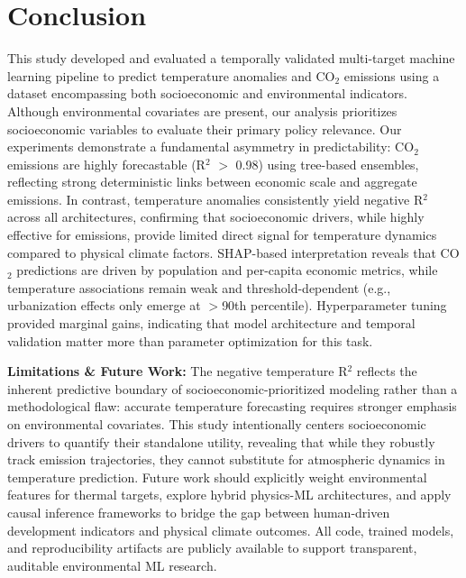 \documentclass[12pt, a4paper]{article}
\begin{document}
\section{Conclusion}
This study developed and evaluated a temporally validated multi-target machine learning pipeline to predict temperature anomalies and CO$_2$ emissions using a dataset encompassing both socioeconomic and environmental indicators. Although environmental covariates are present, our analysis prioritizes socioeconomic variables to evaluate their primary policy relevance. Our experiments demonstrate a fundamental asymmetry in predictability: CO$_2$ emissions are highly forecastable (R$^2$ $>$ 0.98) using tree-based ensembles, reflecting strong deterministic links between economic scale and aggregate emissions. In contrast, temperature anomalies consistently yield negative R$^2$ across all architectures, confirming that socioeconomic drivers, while highly effective for emissions, provide limited direct signal for temperature dynamics compared to physical climate factors.
SHAP-based interpretation reveals that CO$_2$ predictions are driven by population and per-capita economic metrics, while temperature associations remain weak and threshold-dependent (e.g., urbanization effects only emerge at $>$90th percentile). Hyperparameter tuning provided marginal gains, indicating that model architecture and temporal validation matter more than parameter optimization for this task. 

 \textbf{Limitations \& Future Work:} The negative temperature R$^2$ reflects the inherent predictive boundary of socioeconomic-prioritized modeling rather than a methodological flaw: accurate temperature forecasting requires stronger emphasis on environmental covariates. This study intentionally centers socioeconomic drivers to quantify their standalone utility, revealing that while they robustly track emission trajectories, they cannot substitute for atmospheric dynamics in temperature prediction. Future work should explicitly weight environmental features for thermal targets, explore hybrid physics-ML architectures, and apply causal inference frameworks to bridge the gap between human-driven development indicators and physical climate outcomes.
All code, trained models, and reproducibility artifacts are publicly available to support transparent, auditable environmental ML research.

\printbibliography[heading=bibintoc, title=References]

\end{document}
